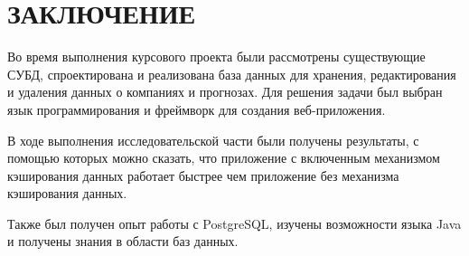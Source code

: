 \chapter*{ЗАКЛЮЧЕНИЕ}

Во время выполнения курсового проекта были рассмотрены существующие СУБД, спроектирована и реализована база данных для хранения, редактирования и удаления данных о компаниях и прогнозах. Для решения задачи был выбран язык программирования и фреймворк для создания веб-приложения.


В ходе выполнения исследовательской части были получены результаты, с помощью которых можно сказать, что приложение с включенным механизмом кэширования данных работает быстрее чем приложение без механизма кэширования данных.

Также был получен опыт работы с PostgreSQL, изучены возможности языка Java и получены знания в области баз данных.